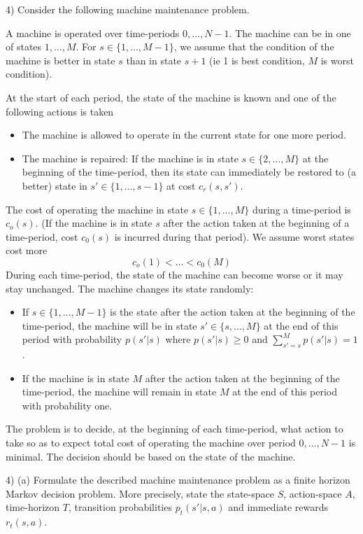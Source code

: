 \documentclass[11pt,a4paper]{article}
\begin{document}
\newpage
\begin{question}{4)}
  Consider the following machine maintenance problem.
  \par A machine is operated over time-periods $0,\dots,N-1$. The machine can be in one of states $1,\dots,M$. For $s\in\{1,\dots,M-1\}$, we assume that the condition of the machine is better in state $s$ than in state $s+1$ (ie 1 is best condition, $M$ is worst condition).
  \par At the start of each period, the state of the machine is known and one of the following actions is taken
  \begin{itemize}
    \item The machine is allowed to operate in the current state for one more period.
    \item The machine is repaired: If the machine is in state $s\in\{2,\dots,M\}$ at the beginning of the time-period, then its state can immediately be restored to (a better) state in $s'\in\{1,\dots,s-1\}$ at cost $c_r(s,s')$.
  \end{itemize}
  The cost of operating the machine in state $s\in\{1,\dots,M\}$ during a time-period is $c_o(s)$. (If the machine is in state $s$ after the action taken at the beginning of a time-period, cost $c_0(s)$ is incurred during that period). We assume worst states cost more
  \[ c_o(1)<\dots<c_0(M) \]
  During each time-period, the state of the machine can become worse or it may stay unchanged. The machine changes its state randomly:
  \begin{itemize}
    \item If $s\in\{1,\dots,M-1\}$ is the state after the action taken at the beginning of the time-period, the machine will be in state $s'\in\{s,\dots,M\}$ at the end of this period with probability $p(s'|s)$ where $p(s'|s)\geq0$ and $\sum_{s'=s}^Mp(s'|s)=1$.
    \item If the machine is in state $M$ after the action taken at the beginning of the time-period, the machine will remain in state $M$ at the end of this period with probability one.
  \end{itemize}
  \par The problem is to decide, at the beginning of each time-period, what action to take so as to expect total cost of operating the machine over period $0,\dots,N-1$ is minimal. The decision should be based on the state of the machine.
\end{question}

\begin{question}{4) (a)}
  Formulate the described machine maintenance problem as a finite horizon Markov decision problem. More precisely, state the state-space $S$, action-space $A$, time-horizon $T$, transition probabilities $p_t(s'|s,a)$ and immediate rewards $r_t(s,a)$.
\end{question}
\end{document}
